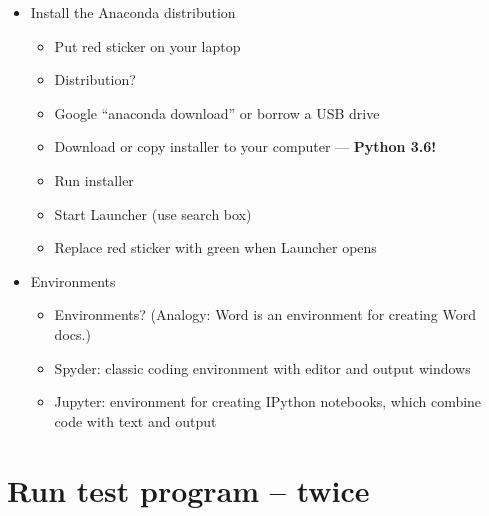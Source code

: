 \begin{itemize}
\item Install the Anaconda distribution
\begin{itemize}
\item Put red sticker on your laptop
\item Distribution?
\item Google ``anaconda download'' or borrow a USB drive
\item Download or copy installer to your computer --- {\bf Python 3.6!}
\item Run installer
\item Start Launcher (use search box)
\item Replace red sticker with green when Launcher opens
\end{itemize}

\item Environments
\begin{itemize}
\item Environments?  (Analogy:  Word is an environment for creating Word docs.)
\item Spyder:  classic coding environment with editor and output windows
\item Jupyter:  environment for creating IPython notebooks, which combine code with text and output
\end{itemize}
\end{itemize}



\section*{Run test program -- twice}

